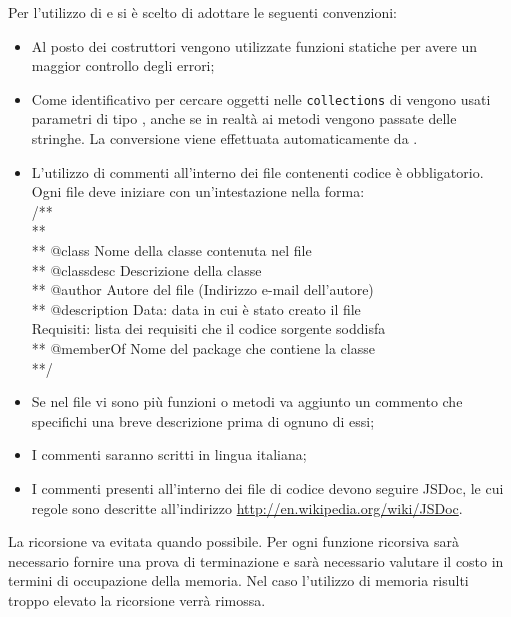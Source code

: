 Per l'utilizzo di  e  si è scelto di adottare le seguenti convenzioni:
\begin{itemize}
\item Al posto dei costruttori vengono utilizzate funzioni statiche per avere un maggior controllo degli errori;
\item Come identificativo per cercare oggetti nelle \texttt{collections} di  vengono usati parametri di tipo \texttt{}, anche se in realtà ai metodi vengono passate delle stringhe. La conversione viene effettuata automaticamente da .
\end{itemize}
\begin{itemize}
\item L'utilizzo di commenti all'interno dei file contenenti codice è obbligatorio.
Ogni file deve iniziare con un'intestazione nella forma:\\
\textcolor{OliveGreen}{/**\\
**\\
** @class Nome della classe contenuta nel file \\
** @classdesc Descrizione della classe\\
** @author Autore del file (Indirizzo e-mail dell'autore)\\
** @description Data: data in cui è stato creato il file\\Requisiti: lista dei requisiti che il codice sorgente soddisfa \\
** @memberOf Nome del package che contiene la classe\\
**/}\\
\item Se nel file vi sono più funzioni o metodi va aggiunto un commento che specifichi una breve descrizione prima di ognuno di essi;
\item I commenti saranno scritti in lingua italiana;
\item I commenti presenti all'interno dei file di codice devono seguire JSDoc, le cui regole sono descritte all'indirizzo \url{http://en.wikipedia.org/wiki/JSDoc}.
\end{itemize}
La ricorsione va evitata quando possibile. Per ogni funzione ricorsiva sarà necessario
fornire una prova di terminazione e sarà necessario valutare il costo in termini di occupazione
della memoria. Nel caso l'utilizzo di memoria risulti troppo elevato la ricorsione
verrà rimossa.
